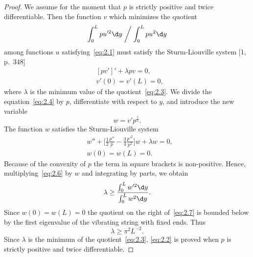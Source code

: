 \documentclass{article}
\theoremstyle{remarks}
\begin{document}
\begin{proof}
  We assume for the moment that $p$ is strictly positive and twice differentiable.
  Then the function $v$ which minimizes the quotient
  \begin{equation}\label{eq:2.3}
    \int_0^L pu'^2 \d y \biggm/ \int_0^L pu^2 \d y
  \end{equation}
  among functions $u$ satisfying~\eqref{eq:2.1} must satisfy the Sturm-Liouville system
  [1, p.~348]
  \begin{equation}\label{eq:2.4}
    \begin{aligned}
      & [pv']' + \lambda pv = 0, \\
      & v'(0) = v'(L) = 0,
    \end{aligned}
  \end{equation}
  where $\lambda$ is the minimum value of the quotient~\eqref{eq:2.3}.
  We divide the equation~\eqref{eq:2.4} by $p$, differentiate with respect
  to $y$, and introduce the new variable
  \begin{equation}\label{eq:2.5}
    w = v' p^{\frac12}.
  \end{equation}
  The function $w$ satisfies the Sturm-Liouville system
  \begin{equation}\label{eq:2.6}
    \begin{aligned}
      & w'' + \biggl[\frac12 \frac{p''}{p} - \frac34\frac{p'^2}{p^2}\biggr]w + \lambda w = 0, \\
      & w(0) = w(L) = 0.
    \end{aligned}
  \end{equation}
  Because of the convexity of $p$ the term in square brackets is non-positive.
  Hence, multiplying~\eqref{eq:2.6} by $w$ and integrating by parts, we obtain
  \begin{equation}\label{eq:2.7}
    \lambda \geq \frac{\int_0^L w'^2 \d y}{\int_0^L w^2 \d y}.
  \end{equation}
  Since $w(0)=w(L)=0$ the quotient on the right of~\eqref{eq:2.7} is bounded
  below by the first eigenvalue of the vibrating string with fixed ends. Thus
  \begin{equation}\label{eq:2.8}
    \lambda \geq \pi^2 L^{-2}.
  \end{equation}
  Since $\lambda$ is the minimum of the quotient~\eqref{eq:2.3},
  \eqref{eq:2.2} is proved when $p$ is strictly positive and twice differentiable.


\end{proof}
\end{document}
